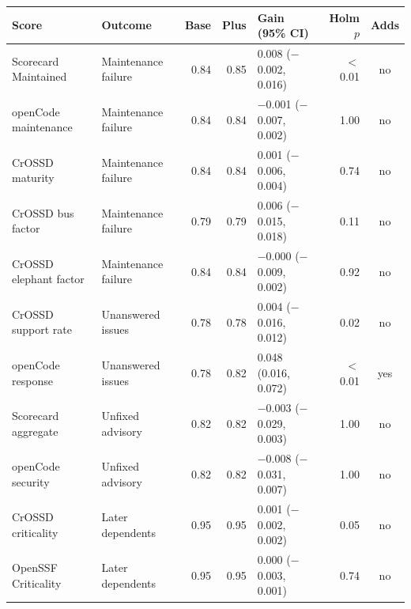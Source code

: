 \begin{tabular}{llrrlrc}
\toprule
Score & Outcome & Base & Plus & Gain (95\% CI) & Holm $p$ & Adds \\
\midrule
Scorecard Maintained & Maintenance failure & 0.84 & 0.85 & 0.008 ($-$0.002, 0.016) & $<$0.01 & no \\
openCode maintenance & Maintenance failure & 0.84 & 0.84 & $-$0.001 ($-$0.007, 0.002) & 1.00 & no \\
CrOSSD maturity & Maintenance failure & 0.84 & 0.84 & 0.001 ($-$0.006, 0.004) & 0.74 & no \\
CrOSSD bus factor & Maintenance failure & 0.79 & 0.79 & 0.006 ($-$0.015, 0.018) & 0.11 & no \\
CrOSSD elephant factor & Maintenance failure & 0.84 & 0.84 & $-$0.000 ($-$0.009, 0.002) & 0.92 & no \\
CrOSSD support rate & Unanswered issues & 0.78 & 0.78 & 0.004 ($-$0.016, 0.012) & 0.02 & no \\
openCode response & Unanswered issues & 0.78 & 0.82 & 0.048 (0.016, 0.072) & $<$0.01 & yes \\
Scorecard aggregate & Unfixed advisory & 0.82 & 0.82 & $-$0.003 ($-$0.029, 0.003) & 1.00 & no \\
openCode security & Unfixed advisory & 0.82 & 0.82 & $-$0.008 ($-$0.031, 0.007) & 1.00 & no \\
CrOSSD criticality & Later dependents & 0.95 & 0.95 & 0.001 ($-$0.002, 0.002) & 0.05 & no \\
OpenSSF Criticality & Later dependents & 0.95 & 0.95 & 0.000 ($-$0.003, 0.001) & 0.74 & no \\
\bottomrule
\end{tabular}
